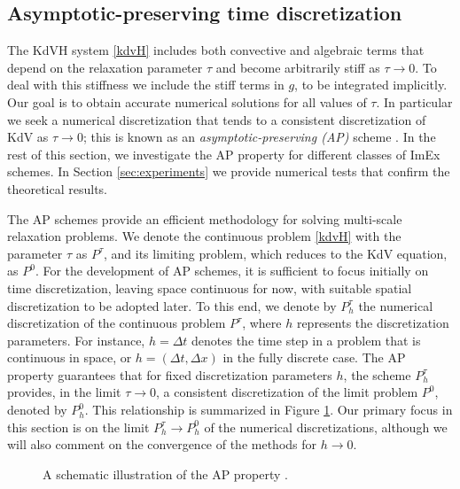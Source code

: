 \documentclass{article}
\begin{document}
\subsection{Asymptotic-preserving time discretization}\label{sec:AP-analysis}
The KdVH system \eqref{kdvH} includes both convective and algebraic terms that
depend on the relaxation parameter $\tau$ and become arbitrarily stiff as
$\tau\to 0$.  To deal with this stiffness we include the stiff terms in $g$,
to be integrated implicitly.
Our goal is to obtain accurate numerical solutions for all values of $\tau$.
In particular we seek a numerical discretization that tends to a consistent discretization of KdV as $\tau \to 0$;
this is known as an \emph{asymptotic-preserving (AP)} scheme \cite{boscarino2024asymptotic,jin2022asymptotic}.
%
In the rest of this section, we investigate the AP property for different classes of ImEx schemes.
In Section \ref{sec:experiments} we provide numerical tests that confirm the theoretical results.

The AP schemes provide an efficient methodology for solving multi-scale relaxation problems.
We denote the continuous problem \eqref{kdvH} with the parameter $\tau$ as $P^{\tau}$, and its limiting problem,
which reduces to the KdV equation, as $P^{0}$. For the development of AP schemes, it is sufficient to focus initially on time
discretization, leaving space continuous for now, with suitable spatial discretization to be adopted later. To this end, we
denote by $P^{\tau}_h$ the numerical discretization of the continuous problem $P^{\tau}$, where $h$ represents the
discretization parameters. For instance, $h = \Delta t$ denotes the time step in a problem that is continuous in space,
or $h = (\Delta t, \Delta x)$ in the fully discrete case. The AP property guarantees that for fixed discretization
parameters $h$, the scheme $P^{\tau}_h$ provides, in the limit $\tau \to 0$, a consistent discretization of the limit
problem $P^{0}$, denoted by $P^{0}_h$. This relationship is summarized in Figure \ref{fig:AP}.
Our primary focus in this section is on the limit $P^\tau_h \to P^0_h$ of the numerical discretizations,
although we will also comment on the convergence of the methods for $h \to 0$.
\begin{figure}[h!]
    \centering
    \caption{A schematic illustration of the AP property \cite{Jin2012}.\label{fig:AP}}
\end{figure}
\end{document}
